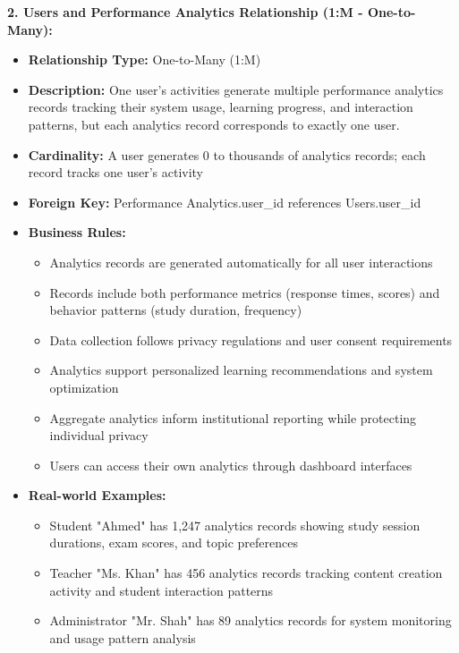 \documentclass[12pt,a4paper,oneside]{book}
\begin{document}
\textbf{2. Users and Performance Analytics Relationship (1:M - One-to-Many):}
\begin{itemize}
    \item \textbf{Relationship Type:} One-to-Many (1:M)
    \item \textbf{Description:} One user's activities generate multiple performance analytics records tracking their system usage, learning progress, and interaction patterns, but each analytics record corresponds to exactly one user.
    \item \textbf{Cardinality:} A user generates 0 to thousands of analytics records; each record tracks one user's activity
    \item \textbf{Foreign Key:} Performance Analytics.user\_id references Users.user\_id
    \item \textbf{Business Rules:}
        \begin{itemize}
            \item Analytics records are generated automatically for all user interactions
            \item Records include both performance metrics (response times, scores) and behavior patterns (study duration, frequency)
            \item Data collection follows privacy regulations and user consent requirements
            \item Analytics support personalized learning recommendations and system optimization
            \item Aggregate analytics inform institutional reporting while protecting individual privacy
            \item Users can access their own analytics through dashboard interfaces
        \end{itemize}
    \item \textbf{Real-world Examples:}
        \begin{itemize}
            \item Student "Ahmed" has 1,247 analytics records showing study session durations, exam scores, and topic preferences
            \item Teacher "Ms. Khan" has 456 analytics records tracking content creation activity and student interaction patterns
            \item Administrator "Mr. Shah" has 89 analytics records for system monitoring and usage pattern analysis
        \end{itemize}
\end{itemize}
\end{document}

